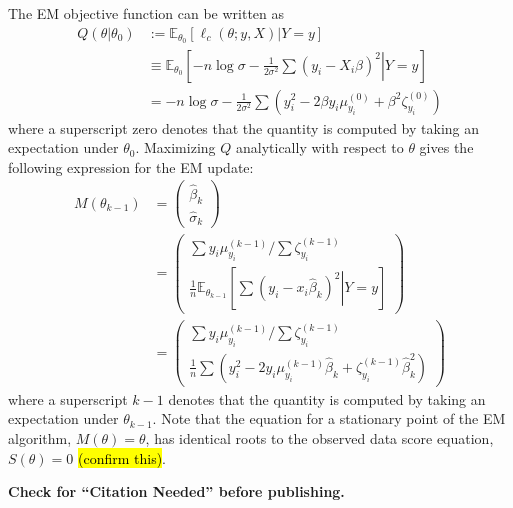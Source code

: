 \documentclass[11pt, oneside]{article}   	%
\newcommand{\bE}{\mathbb{E}}
\begin{document}
\begin{appendices}
    The EM objective function can be written as
    \begin{align}
		Q(\theta | \theta_0) &:= \bE_{\theta_0} [\ell_c (\theta; y, X) | Y=y]\\
		&\equiv \bE_{\theta_0} \left[ \left. -n \log \sigma - \frac{1}{2\sigma^2} \sum (y_i - X_i \beta)^2 \right| Y=y \right]\\
        &= -n \log \sigma - \frac{1}{2\sigma^2} \sum \left( y_i^2 - 2 \beta y_i \mu_{y_i}^{(0)} + \beta^2 \zeta^{(0)}_{y_i} \right)
	\end{align}
    where a superscript zero denotes that the quantity is computed by taking an expectation under $\theta_0$. Maximizing $Q$ analytically with respect to $\theta$ gives the following expression for the EM update:
    \begin{align}
        M(\theta_{k-1}) &= \begin{pmatrix}
            \hat{\beta}_k\\ \hat{\sigma}_k
        \end{pmatrix}\\
        &= \begin{pmatrix}
            {\sum y_i \mu_{y_i}^{(k-1)}} / {\sum \zeta_{y_i}^{(k-1)}}\\
            \frac{1}{n} \bE_{\theta_{k-1}} \left[ \left. \sum (y_i - x_i \hat{\beta}_k)^2 \right| Y=y \right]
        \end{pmatrix}\\
        &= \begin{pmatrix}
            {\sum y_i \mu_{y_i}^{(k-1)}} / {\sum \zeta_{y_i}^{(k-1)}}\\
            \frac{1}{n} \sum \left( y_i^2 - 2 y_i \mu_{y_i}^{(k-1)} \hat{\beta}_k  + \zeta^{(k-1)}_{y_i} \hat{\beta}_k^2  \right)
        \end{pmatrix}
    \end{align}
    where a superscript $k-1$ denotes that the quantity is computed by taking an expectation under $\theta_{k-1}$. Note that the equation for a stationary point of the EM algorithm, $M(\theta) = \theta$, has identical roots to the observed data score equation, $S(\theta) = 0$ \hl{(confirm this)}.

\end{appendices}

\newpage

\textbf{Check for ``Citation Needed'' before publishing.}




\printindex
\end{document}
